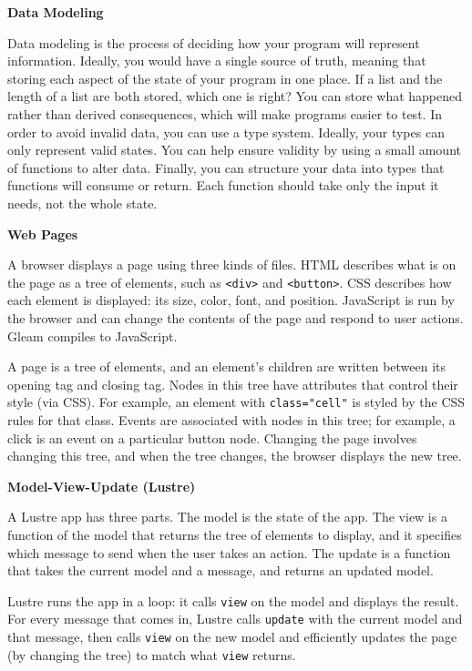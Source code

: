 \begin{blocksection}
\textbf{Data Modeling}

Data modeling is the process of deciding how your program will represent information. Ideally, you would have a single source of truth, meaning that storing each aspect of the state of your program in one place. If a list and the length of a list are both stored, which one is right? You can store what happened rather than derived consequences, which will make programs easier to test. In order to avoid invalid data, you can use a type system. Ideally, your types can only represent valid states. You can help ensure validity by using a small amount of functions to alter data. Finally, you can structure your data into types that functions will consume or return. Each function should take only the input it needs, not the whole state.

\vspace{\baselineskip}
\textbf{Web Pages}

A browser displays a page using three kinds of files. HTML describes what is on the page as a tree of elements, such as \lstinline$<div>$ and \lstinline$<button>$. CSS describes how each element is displayed: its size, color, font, and position. JavaScript is run by the browser and can change the contents of the page and respond to user actions. Gleam compiles to JavaScript.

A page is a tree of elements, and an element's children are written between its opening tag and closing tag. Nodes in this tree have attributes that control their style (via CSS). For example, an element with \lstinline$class="cell"$ is styled by the CSS rules for that class. Events are associated with nodes in this tree; for example, a click is an event on a particular button node. Changing the page involves changing this tree, and when the tree changes, the browser displays the new tree.

\vspace{\baselineskip}
\textbf{Model-View-Update (Lustre)}

A Lustre app has three parts. The model is the state of the app. The view is a function of the model that returns the tree of elements to display, and it specifies which message to send when the user takes an action. The update is a function that takes the current model and a message, and returns an updated model.

Lustre runs the app in a loop: it calls \lstinline$view$ on the model and displays the result. For every message that comes in, Lustre calls \lstinline$update$ with the current model and that message, then calls \lstinline$view$ on the new model and efficiently updates the page (by changing the tree) to match what \lstinline$view$ returns.


\end{blocksection}
